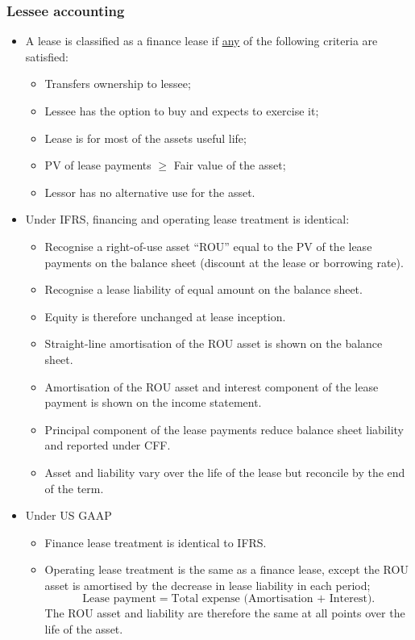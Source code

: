 \documentclass[../notes_compiled.tex]{subfiles}
\begin{document}
\subsubsection{Lessee accounting}
\begin{itemize}
\item A lease is classified as a finance lease if \underline{any} of the following criteria are satisfied:
\begin{itemize}
\item Transfers ownership to lessee;
\item Lessee has the option to buy and expects to exercise it;
\item Lease is for most of the assets useful life;
\item PV of lease payments $\geq$ Fair value of the asset;
\item Lessor has no alternative use for the asset.
\end{itemize}

\item Under IFRS, financing and operating lease treatment is identical:
\begin{itemize}
\item Recognise a right-of-use asset ``ROU'' equal to the PV of the lease payments on the balance sheet (discount at the lease or borrowing rate).
\item Recognise a lease liability of equal amount on the balance sheet.
\item Equity is therefore unchanged at lease inception.
\item Straight-line amortisation of the ROU asset is shown on the balance sheet.
\item Amortisation of the ROU asset and interest component of the lease payment is shown on the income statement.
\item Principal component of the lease payments reduce balance sheet liability and reported under CFF.
\item Asset and liability vary over the life of the lease but reconcile by the end of the term.
\end{itemize}

\item Under US GAAP
\begin{itemize}
\item Finance lease treatment is identical to IFRS.
\item Operating lease treatment is the same as a finance lease, except the ROU asset is amortised by the decrease in lease liability in each period;
\begin{equation}
\text{Lease payment} = \text{Total expense (Amortisation + Interest)}.
\end{equation}
The ROU asset and liability are therefore the same at all points over the life of the asset.
\end{itemize}


\end{itemize}
\end{document}
